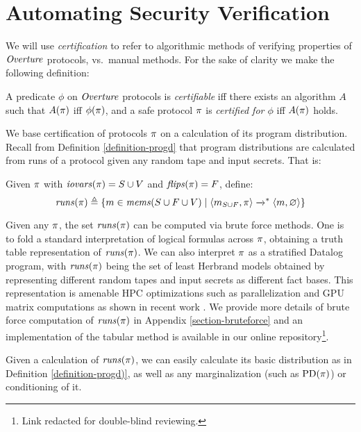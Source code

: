 \section{Automating Security Verification}

We will use \emph{certification} to refer to algorithmic methods of
verifying properties of $\mathit{Overture}$ protocols, vs.~manual methods. For
the sake of clarity we make the following definition:
\begin{definition}
  A predicate $\phi$ on $\mathit{Overture}$ protocols is \emph{certifiable} iff
  there exists an algorithm $A$ such that $A(\pi)$ iff $\phi(\pi)$,
  and a safe protocol $\pi$ is \emph{certified for $\phi$} iff
  $A(\pi)$ holds.
\end{definition}

We base certification of protocols $\pi$ on a calculation of its
program distribution. Recall from Definition \ref{definition-progd} that
program distributions are calculated from runs of a protocol given
any random tape and input secrets. That is:
\begin{definition}
  Given $\pi$ with $\mathit{iovars}(\pi) = S \cup V$ and $\mathit{flips}(\pi) = F$, define:
  $$
  \mathit{runs}(\pi) \triangleq \{ m \in \mathit{mems}(S\cup F \cup V) \mid \langle m_{S \cup F},\pi \rangle \xrightarrow{}^{*} \langle m,\varnothing \rangle \}
  $$
\end{definition}

Given any $\pi$, the set $\mathit{runs}(\pi)$ can be computed via brute
force methods. One is to fold a standard interpretation of logical
formulas across $\pi$, obtaining a truth table representation of
$\mathit{runs}(\pi)$. We can also interpret $\pi$ as a stratified Datalog
program, with $\mathit{runs}(\pi)$ being the set of least Herbrand models
obtained by representing different random tapes and input secrets as
different fact bases. This representation is amenable HPC
optimizations such as parallelization and GPU matrix computations as
shown in recent work
\cite{sakama2017linear,aspis2018linear,nguyen2022enhancing,nguyen2021efficient}.
We provide more details of brute force computation of $\mathit{runs}(\pi)$ in
Appendix \ref{section-bruteforce} and an implementation of
the tabular method is available in our online repository\footnote{Link
redacted for double-blind reviewing.}.

Given a calculation of $\mathit{runs}(\pi)$, we can easily calculate its
basic distribution as in Definition \ref{definition-progd)}, as well
as any marginalization (such as $\mathrm{PD}(\pi)$) or conditioning of it.

